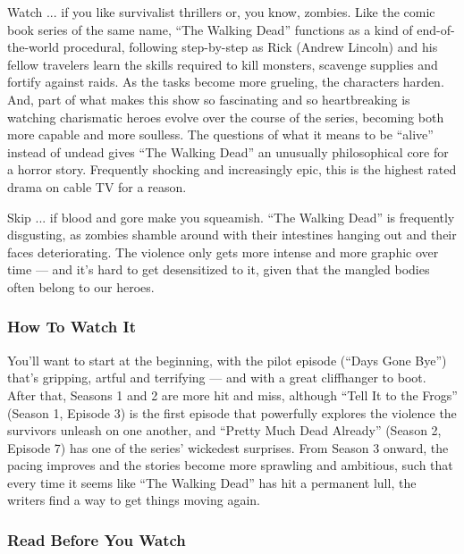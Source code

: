 Watch ... if you like survivalist thrillers or, you know, zombies. Like
the comic book series of the same name, ``The Walking Dead'' functions
as a kind of end-of-the-world procedural, following step-by-step as Rick
(Andrew Lincoln) and his fellow travelers learn the skills required to
kill monsters, scavenge supplies and fortify against raids. As the tasks
become more grueling, the characters harden. And, part of what makes
this show so fascinating and so heartbreaking is watching charismatic
heroes evolve over the course of the series, becoming both more capable
and more soulless. The questions of what it means to be ``alive''
instead of undead gives ``The Walking Dead'' an unusually philosophical
core for a horror story. Frequently shocking and increasingly epic, this
is the highest rated drama on cable TV for a reason.

Skip ... if blood and gore make you squeamish. ``The Walking Dead'' is
frequently disgusting, as zombies shamble around with their intestines
hanging out and their faces deteriorating. The violence only gets more
intense and more graphic over time --- and it's hard to get desensitized
to it, given that the mangled bodies often belong to our heroes.

\hypertarget{how-to-watch-it}{%
\subsubsection{How To Watch It}\label{how-to-watch-it}}

You'll want to start at the beginning, with the pilot episode (``Days
Gone Bye'') that's gripping, artful and terrifying --- and with a great
cliffhanger to boot. After that, Seasons 1 and 2 are more hit and miss,
although ``Tell It to the Frogs'' (Season 1, Episode 3) is the first
episode that powerfully explores the violence the survivors unleash on
one another, and ``Pretty Much Dead Already'' (Season 2, Episode 7) has
one of the series' wickedest surprises. From Season 3 onward, the pacing
improves and the stories become more sprawling and ambitious, such that
every time it seems like ``The Walking Dead'' has hit a permanent lull,
the writers find a way to get things moving again.

\hypertarget{read-before-you-watch}{%
\subsubsection{Read Before You Watch}\label{read-before-you-watch}}

\href{http://www.nytimes3xbfgragh.onion/2010/10/29/arts/television/29walking.html}{}

